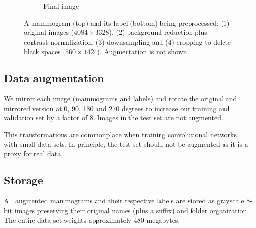 \begin{figure}[h]
\begin{subfigure}{2.4 cm}
		\caption{Final image}
		\label{subfig:Preprocessingd}
    \end{subfigure}
	\caption[Preprocessing pipeline]{A mammogram (top) and its label (bottom) being preprocessed: (1) original images ($4084 \times 3328$), (2) background reduction plus contrast normalization, (3) downsampling and  (4) cropping to delete black spaces ($560 \times 1424$). Augmentation is not shown.}
	 \label{fig:Preprocessing}
\end{figure}
	
\subsection{Data augmentation}
We mirror each image (mammograms and labels) and rotate the original and mirrored version at 0, 90, 180 and 270 degrees to increase our training and validation set by a factor of 8. 
Images in the test set are not augmented.

This transformations are commonplace when training convolutional networks with small data sets. In principle, the test set should not be augmented as it is a proxy for real data. %


\subsection{Storage}
All augmented mammograms and their respective labels are stored as grayscale 8-bit images preserving their original names (plus a suffix) and folder organization.
The entire data set weights approximately 480 megabytes.
